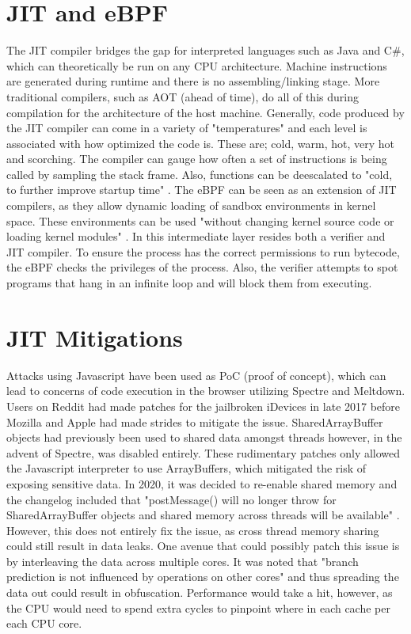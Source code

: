 \documentclass[conference]{IEEEtran}
\begin{document}
\section{JIT and eBPF}

The JIT compiler bridges the gap for interpreted languages such as Java and C\#, which can theoretically be run on any CPU architecture.
Machine instructions are generated during runtime and there is no assembling/linking stage.
More traditional compilers, such as AOT (ahead of time), do all of this during compilation for the architecture of the host machine.
Generally, code produced by the JIT compiler can come in a variety of "temperatures" and each level is associated with how optimized the code is.
These are; cold, warm, hot, very hot and scorching.
The compiler can gauge how often a set of instructions is being called  by sampling the stack frame.
Also, functions can be deescalated to "cold, to further improve startup time" \autocite{gillis_2019}.
The eBPF can be seen as an extension of JIT compilers, as they allow dynamic loading of sandbox environments in kernel space.
These environments can be used "without changing kernel source code or loading kernel modules" \autocite{EBPF}.
In this intermediate layer resides both a verifier and JIT compiler.
To ensure the process has the correct permissions to run bytecode, the eBPF checks the privileges of the process.
Also, the verifier attempts to spot programs that hang in an infinite loop and will block them from executing.


\section{JIT Mitigations}

    Attacks using Javascript have been used as PoC (proof of concept), which can lead to concerns of code execution in the browser utilizing Spectre and Meltdown.
Users on Reddit had made patches for the jailbroken iDevices in late 2017 before Mozilla and Apple had made strides to mitigate the issue.
SharedArrayBuffer objects had previously been used to shared data amongst threads however, in the advent of Spectre, was disabled entirely.
These rudimentary patches only allowed the Javascript interpreter to use ArrayBuffers, which mitigated the risk of exposing sensitive data.
In 2020, it was decided to re-enable shared memory and the changelog included that "postMessage() will no longer throw for SharedArrayBuffer objects and shared memory across threads will be available" \autocite{mozilla_2021}.
However, this does not entirely fix the issue, as cross thread memory sharing could still result in data leaks.
One avenue that could possibly patch this issue is by interleaving the data across multiple cores.
It was noted that "branch prediction is not influenced by operations on other cores" \autocite[9]{SpectreAttacksExploiting} and thus spreading the data out could result in obfuscation.
Performance would take a hit, however, as the CPU would need to spend extra cycles to pinpoint where in each cache per each CPU core.
\end{document}
